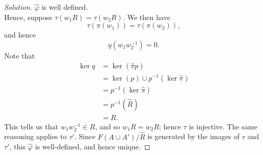 \documentclass[12pt]{article}
\newenvironment{solution}
  {\renewcommand\qedsymbol{$\blacksquare$}\begin{proof}[Solution]}
{\end{proof}}
\theoremstyle{remark}
\begin{document}
\begin{solution}
  $\hat\varphi$ is well defined. \\
  Hence, suppose $\tau(w_1R) = \tau(w_2R)$.
  We then have 
  \begin{equation*}
    \tau(\pi(w_1)) = \tau(\pi(w_2)),
  \end{equation*}
  and hence
  \begin{equation*}
    q(w_1w_2^{-1}) = 0.
  \end{equation*}
  Note that
  \begin{align*}
    \ker q &= \ker (\hat\pi p) \\
    &= \ker(p) \cup p^{-1}(\ker \hat\pi) \\
    &= p^{-1}(\ker \hat\pi) \\
    &= p^{-1}(\hat{R}) \\
    &= R.
  \end{align*}
  This tells us that $w_1w_2^{-1}\in R$, and so $w_1R = w_2R$; hence $\tau$ is injective.
  The same reasoning applies to $\tau'$.
  Since $F(A\cup A')/\hat{R}$ is generated by the images of $\tau$ and $\tau'$,  this
  $\hat\varphi$ is well-defined, and hence unique.
\end{solution}
\end{document}
